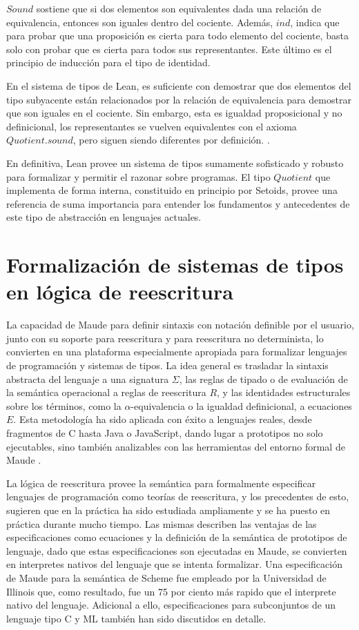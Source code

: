 $Sound$ sostiene que si dos elementos son equivalentes dada una relación de equivalencia, entonces son iguales dentro del cociente. Además, $ind$, indica que para probar que una proposición es cierta para todo elemento del cociente, basta solo con probar que es cierta para todos sus representantes. Este último es el principio de inducción para el tipo de identidad.

En el sistema de tipos de Lean, es suficiente con demostrar que dos elementos del tipo subyacente están relacionados por la relación de equivalencia para demostrar que son iguales en el cociente. Sin embargo, esta es igualdad proposicional y no definicional, los representantes se vuelven equivalentes con el axioma $Quotient.sound$, pero siguen siendo diferentes por definición.  \citep{leanReference}.

En definitiva, Lean provee un sistema de tipos sumamente sofisticado y robusto para formalizar y permitir el razonar sobre programas. El tipo $Quotient$ que implementa de forma interna, constituido en principio por Setoids, provee una referencia de suma importancia para entender los fundamentos y antecedentes de este tipo de abstracción en lenguajes actuales.

\section{Formalización de sistemas de tipos en lógica de reescritura}

La capacidad de Maude para definir sintaxis con notación definible por el usuario, junto con su soporte para reescritura y para reescritura no determinista, lo convierten en una plataforma especialmente apropiada para formalizar lenguajes de programación y sistemas de tipos. La idea general es trasladar la sintaxis abstracta del lenguaje a una signatura $\Sigma$, las reglas de tipado o de evaluación de la semántica operacional a reglas de reescritura $R$, y las identidades estructurales sobre los términos, como la $\alpha$-equivalencia o la igualdad definicional, a ecuaciones $E$. Esta metodología ha sido aplicada con éxito a lenguajes reales, desde fragmentos de C hasta Java o JavaScript, dando lugar a prototipos no solo ejecutables, sino también analizables con las herramientas del entorno formal de Maude \citep{duran2019}.

La lógica de reescritura provee la semántica para formalmente especificar lenguajes de programación como teorías de reescritura, y los precedentes de esto, sugieren que en la práctica ha sido estudiada ampliamente y se ha puesto en práctica durante mucho tiempo. Las mismas describen las ventajas de las especificaciones como ecuaciones y la definición de la semántica de prototipos de lenguaje, dado que estas especificaciones son ejecutadas en Maude, se convierten en interpretes nativos del lenguaje que se intenta formalizar. Una especificación de Maude para la semántica de Scheme fue empleado por la Universidad de Illinois que, como resultado, fue un 75 por ciento más rapido que el interprete nativo del lenguaje. Adicional a ello, especificaciones para subconjuntos de un lenguaje tipo C y ML también han sido discutidos en detalle.


